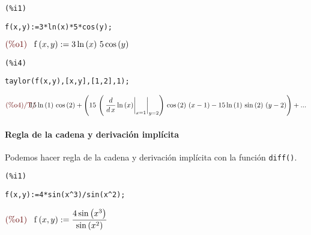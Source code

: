\documentclass[12pt]{article}
\begin{document}
\noindent
\begin{minipage}[t]{8ex}{\color{red}\bf
\begin{verbatim}
(%i1) 
\end{verbatim}}
\end{minipage}
\begin{minipage}[t]{\textwidth}{\color{blue}
\begin{verbatim}
f(x,y):=3*ln(x)*5*cos(y);
\end{verbatim}}
\end{minipage}
\begin{math}\displaystyle
\parbox{8ex}{\color{labelcolor}(\%o1) }
\mathrm{f}\left( x,y\right) :=3\,\mathrm{ln}\left( x\right) \,5\,\mathrm{cos}\left( y\right) 
\end{math}


\noindent
\begin{minipage}[t]{8ex}{\color{red}\bf
\begin{verbatim}
(%i4) 
\end{verbatim}}
\end{minipage}
\begin{minipage}[t]{\textwidth}{\color{blue}
\begin{verbatim}
taylor(f(x,y),[x,y],[1,2],1);
\end{verbatim}}
\end{minipage}
\begin{math}\displaystyle
\parbox{8ex}{\color{labelcolor}(\%o4)/T/ }
15\,\mathrm{ln}\left( 1\right) \,\mathrm{cos}\left( 2\right) +\left( 15\,\left( \left. \left. \frac{d}{d\,x}\,\mathrm{ln}\left( x\right) \right|_{x=1}\right|_{y=2}\right) \,\mathrm{cos}\left( 2\right) \,\left( x-1\right) -15\,\mathrm{ln}\left( 1\right) \,\mathrm{sin}\left( 2\right) \,\left( y-2\right) \right) +...
\end{math}

\paragraph{Regla de la cadena y derivación implícita} Podemos hacer regla de la cadena y derivación implícita con la función \texttt{diff()}.

\noindent
\begin{minipage}[t]{8ex}{\color{red}\bf
\begin{verbatim}
(%i1) 
\end{verbatim}}
\end{minipage}
\begin{minipage}[t]{\textwidth}{\color{blue}
\begin{verbatim}
f(x,y):=4*sin(x^3)/sin(x^2);
\end{verbatim}}
\end{minipage}
\begin{math}\displaystyle
\parbox{8ex}{\color{labelcolor}(\%o1) }
\mathrm{f}\left( x,y\right) :=\frac{4\,\mathrm{sin}\left( {x}^{3}\right) }{\mathrm{sin}\left( {x}^{2}\right) }
\end{math}
\end{document}
